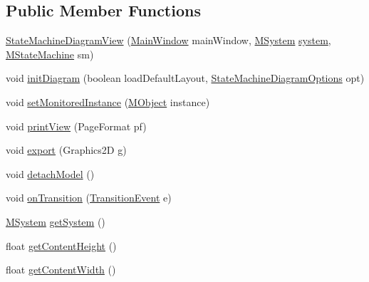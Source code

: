 \subsection*{Public Member Functions}
\begin{DoxyCompactItemize}
\item 
\hyperlink{classorg_1_1tzi_1_1use_1_1gui_1_1views_1_1diagrams_1_1statemachine_1_1_state_machine_diagram_view_ad9403ca1f2be5c35a7643079b48431c8}{State\-Machine\-Diagram\-View} (\hyperlink{classorg_1_1tzi_1_1use_1_1gui_1_1main_1_1_main_window}{Main\-Window} main\-Window, \hyperlink{classorg_1_1tzi_1_1use_1_1uml_1_1sys_1_1_m_system}{M\-System} \hyperlink{classorg_1_1tzi_1_1use_1_1gui_1_1views_1_1diagrams_1_1statemachine_1_1_state_machine_diagram_view_af2f54ac086a677b0a87ff42852537ef2}{system}, \hyperlink{classorg_1_1tzi_1_1use_1_1uml_1_1mm_1_1statemachines_1_1_m_state_machine}{M\-State\-Machine} sm)
\item 
void \hyperlink{classorg_1_1tzi_1_1use_1_1gui_1_1views_1_1diagrams_1_1statemachine_1_1_state_machine_diagram_view_a309ab7b14c6115d32c5476947230b7c0}{init\-Diagram} (boolean load\-Default\-Layout, \hyperlink{classorg_1_1tzi_1_1use_1_1gui_1_1views_1_1diagrams_1_1statemachine_1_1_state_machine_diagram_options}{State\-Machine\-Diagram\-Options} opt)
\item 
void \hyperlink{classorg_1_1tzi_1_1use_1_1gui_1_1views_1_1diagrams_1_1statemachine_1_1_state_machine_diagram_view_aeaaafd8c8c5ff74a6f75e87a53c35feb}{set\-Monitored\-Instance} (\hyperlink{interfaceorg_1_1tzi_1_1use_1_1uml_1_1sys_1_1_m_object}{M\-Object} instance)
\item 
void \hyperlink{classorg_1_1tzi_1_1use_1_1gui_1_1views_1_1diagrams_1_1statemachine_1_1_state_machine_diagram_view_a3b8d492494009a98d678f0f1cd33b576}{print\-View} (Page\-Format pf)
\item 
void \hyperlink{classorg_1_1tzi_1_1use_1_1gui_1_1views_1_1diagrams_1_1statemachine_1_1_state_machine_diagram_view_a64b4e008079948a0e21e5acebe77c4d2}{export} (Graphics2\-D g)
\item 
void \hyperlink{classorg_1_1tzi_1_1use_1_1gui_1_1views_1_1diagrams_1_1statemachine_1_1_state_machine_diagram_view_a3485b6fa6c75ff5e11352297ceb1efd1}{detach\-Model} ()
\item 
void \hyperlink{classorg_1_1tzi_1_1use_1_1gui_1_1views_1_1diagrams_1_1statemachine_1_1_state_machine_diagram_view_a96705e555fb77ef992a0d27be248ed80}{on\-Transition} (\hyperlink{classorg_1_1tzi_1_1use_1_1uml_1_1sys_1_1events_1_1_transition_event}{Transition\-Event} e)
\item 
\hyperlink{classorg_1_1tzi_1_1use_1_1uml_1_1sys_1_1_m_system}{M\-System} \hyperlink{classorg_1_1tzi_1_1use_1_1gui_1_1views_1_1diagrams_1_1statemachine_1_1_state_machine_diagram_view_a96c111a2c90630a460a630ae05bc42ed}{get\-System} ()
\item 
float \hyperlink{classorg_1_1tzi_1_1use_1_1gui_1_1views_1_1diagrams_1_1statemachine_1_1_state_machine_diagram_view_a920289f45dc3a61f28932f8430573f79}{get\-Content\-Height} ()
\item 
float \hyperlink{classorg_1_1tzi_1_1use_1_1gui_1_1views_1_1diagrams_1_1statemachine_1_1_state_machine_diagram_view_acc845226e0df41e8ec32309cdbda2566}{get\-Content\-Width} ()
\end{DoxyCompactItemize}
